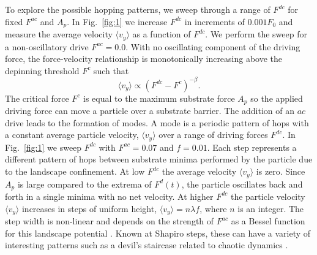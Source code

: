 \documentclass[twocolumn,preprintnumbers,amsmath,amssymb,aps,prx]{revtex4}
\begin{document}
To explore the possible hopping patterns,
we sweep through a range of $F^{dc}$ for fixed $F^{ac}$ and $A_p$.
In Fig.~\ref{fig:1} 
we increase $F^{dc}$ in increments of $0.001 F_0$
and 
measure the average velocity $\langle v_y \rangle $ 
as a function of $F^{dc}$.
We perform the sweep for a non-oscillatory drive $F^{ac} = 0.0$.
With no oscillating component of the driving force,
  the force-velocity relationship is monotonically increasing
  above the depinning threshold $F^c$ such that
  \begin{equation}
    \langle v_y \rangle \propto (F^{dc}-F^c)^{-\beta}.
  \end{equation}
  The critical force $F^c$ is equal to the maximum substrate force
  $A_p$ so the applied driving
  force can move a particle over a substrate barrier.
  The addition of an $ac$ drive leads
  to the formation of modes.
  A mode is a periodic pattern of hops
  with a constant average particle velocity, $\langle {v}_{y} \rangle$
  over a range of driving forces $F^{dc}$.
  In Fig.~\ref{fig:1}
  we sweep $F^{dc}$
  with $F^{ac} = 0.07$ and $f=0.01$.
Each step represents a different pattern of hops
between substrate minima
performed by the particle
due to the landscape confinement.  
At %
low $F^{dc}$ the average velocity $\langle v_y \rangle$ is zero.
Since 
$A_p$ is large compared to the extrema of $F^{d}(t)$,
the particle oscillates back and forth
in a single minima with no net velocity.
At higher $F^{dc}$ the particle velocity 
$\langle v_{y} \rangle$ increases in steps of uniform height,
$\langle v_{y} \rangle = n \lambda f$,
where $n$ is an integer.
The step width is non-linear
and depends on the strength of $F^{ac}$
as a Bessel function 
for this landscape potential \cite{Reichhardt2000,Juniper2017}.
Known at Shapiro steps,
these can have a variety of
interesting patterns
such as a devil's staircase related to chaotic dynamics \cite{Bak1986}.
\end{document}
